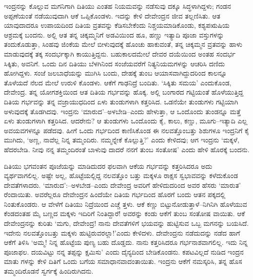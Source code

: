 ಇಂದ್ರನನ್ನು ಕೊಲ್ಲುವ ಮಗನಿಗಾಗಿ ದಿತಿಯು ಎಂತಹ ನಿಯಮವನ್ನು ನಡೆಸುವು ದಕ್ಕೂ ಸಿದ್ಧಳಾಗಿದ್ದಳು; ಗಂಡನ ಅಪ್ಪಣೆಯಂತೆ ನಡೆಯುವುದಾಗಿ ಆಕೆ ಒಪ್ಪಿಕೊಂಡಳು. ಇದನ್ನು ಕೇಳಿ ದೇವೇಂದ್ರನ ಜೀವ ತಲ್ಲಣಿಸಿತು. ಆತ ಯಾವುದಾದರೂ ಉಪಾಯದಿಂದ ದಿತಿಯ ವ್ರತವನ್ನು ಕೆಡಿಸಬೇಕೆಂದು ನಿಶ್ಚಯಮಾಡಿಕೊಂಡು, ಕಶ್ಯಪಋಷಿಯ ಆಶ್ರಮಕ್ಕೆ ಬಂದನು. ಅಲ್ಲಿ ಆತ ತನ್ನ ಚಿಕ್ಕಮ್ಮನಿಗೆ ಅಡವಿಯಿಂದ ಹೂ, ಹಣ್ಣು ಇತ್ಯಾದಿ ಪೂಜಾ ವಸ್ತುಗಳನ್ನು ತಂದುಕೊಡುತ್ತಾ, ಸಿಂಹವು ಜಿಂಕೆಯ ಮೇಲೆ ಬೀಳುವುದಕ್ಕೆ ಹೊಂಚು ಹಾಕುವಂತೆ, ತನ್ನ ಚಿಕ್ಕಮ್ಮನ ವ್ರತವನ್ನು ಹಾಳು ಮಾಡುವುದಕ್ಕೆ ತಕ್ಕ ಸಂದರ್ಭಕ್ಕಾಗಿ ಕಾಯುತ್ತಿದ್ದನು. ಬಹುಕಾಲದಮೇಲೆ ದೇವರ ದಯೆಯಿಂದ ಅಂತಹ ಸಂದರ್ಭ ಸಿಕ್ಕಿತು, ಅವನಿಗೆ. ಒಂದು ದಿನ ದಿತಿಯು ಬೆಳಗಿನಿಂದ ಸಂಜೆಯವರೆಗೆ ನಿತ್ಯನಿಯಮಗಳನ್ನು ಆಚರಿಸಿ ದಣಿದು ಹೋಗಿದ್ದಳು. ಸಂಜೆ ಜಲಬಾಧೆಯನ್ನು ಮುಗಿಸಿ ಬಂದು, ದೇಹಕ್ಕೆ ತುಂಬ ಆಯಾಸವಾಗಿದ್ದುದರಿಂದ ಕಾಲನ್ನೂ ತೊಳೆಯದೆ ನೆಲದ ಮೇಲೆ ಉರುಳಿ ಕೊಂಡಳು. ಆಕೆಗೆ ಗಾಢನಿದ್ರೆ ಬಂದಿತು. ‘ಸಿಕ್ಕಿತು ಸಮಯ’ ಎಂದುಕೊಂಡ, ದೇವೇಂದ್ರ. ತನ್ನ ಯೋಗಶಕ್ತಿಯಿಂದ ಆತ ದಿತಿಯ ಗರ್ಭವನ್ನು ಹೊಕ್ಕ. ಅಲ್ಲಿ ಬಂಗಾರದ ಗಟ್ಟಿಯಂತೆ ಹೊಳೆಯುತ್ತಿದ್ದ ದಿತಿಯ ಗರ್ಭವನ್ನು ತನ್ನ ವಜ್ರಾಯುಧದಿಂದ ಏಳು ತುಂಡುಗಳಾಗಿ ಕತ್ತರಿಸಿದ. ಒಡನೆಯೇ ತುಂಡುಗಳು ಗಟ್ಟಿಯಾಗಿ ಅಳುವುದಕ್ಕೆ ತೊಡಗಿದವು. ಇಂದ್ರನು ‘ಮಾರುದ’–ಅಳಬೇಡಿ–ಎಂದು ಹೇಳುತ್ತಾ, ಆ ಒಂದೊಂದು ತುಂಡನ್ನೂ ಮತ್ತೆ ಏಳು ತುಂಡುಗಳಾಗಿ ಕತ್ತರಿಸಿದ. ಆದರೇನು? ಆ ತುಂಡುಗಳು ಒಂದೊಂದು ಕೈ, ಕಾಲು, ಕಣ್ಣು, ಮೂಗು–ಇತ್ಯಾದಿ ಎಲ್ಲ ಅವಯವಗಳನ್ನೂ ಪಡೆದವು. ಹೀಗೆ ಒಂದು ಗರ್ಭದಿಂದ ಕಾಣಿಸಿಕೊಂಡ ಈ ನಲವತ್ತೊಂಬತ್ತು ಶಿಶುಗಳೂ ಇಂದ್ರನಿಗೆ ಕೈ ಮುಗಿದು, ‘ಅಣ್ಣ, ನಾವೆಲ್ಲ ನಿನ್ನ ತಮ್ಮಂದಿರು. ನಮ್ಮನ್ನೇಕೆ ಕೊಲ್ಲುತ್ತಿ?’ ಎಂದು ಕೇಳಿದವು; ಆಗ ಇಂದ್ರನು ‘ಮಕ್ಕಳೆ, ಹೆದರಬೇಡಿ. ನೀವು ನನ್ನ ತಮ್ಮಂದಿರಂತೆ ಬಾಳುವು ದಾದರೆ ನನಗೆ ತುಂಬ ಸಂತೋಷ’ ಎಂದು ಹೇಳಿ ಹೊರಕ್ಕೆ ಬಂದನು. 

ದಿತಿಯು ಭಗವಂತನ ಪೂಜೆಯನ್ನು ಮಾಡಿದುದರ ಫಲವಾಗಿ ಆಕೆಯ ಗರ್ಭವನ್ನು ಕತ್ತರಿಸಿದರೂ ಅದು ವ್ಯರ್ಥವಾಗಲಿಲ್ಲ. ಅಷ್ಟೇ ಅಲ್ಲ, ಹೊಟ್ಟೆಯಲ್ಲಿದ್ದ ನಲವತ್ತೊಂ ಬತ್ತು ಮಕ್ಕಳೂ ರಾಕ್ಷಸ ಸ್ವಭಾವವನ್ನು ಕಳೆದುಕೊಂಡ ದೇವತೆಗಳಾದರು. ‘ಮಾರುದ’:–ಅಳಬೇಡ–ಎಂದು ದೇವೇಂದ್ರ ಅವರಿಗೆ ಹೇಳಿದುದರಿಂದ ಅವರ ಹೆಸರು ‘ಮಾರುತ’ ರೆಂದಾಯಿತು. ಅವರೆಲ್ಲರೂ ದೇವೇಂದ್ರನ ಹಿಂದೆಯೇ ದಿತಿಯ ಗರ್ಭದಿಂದ ಹೊರಗೆ ಬಂದು ಆತನ ಪಕ್ಕದಲ್ಲಿ ನಿಂತುಕೊಂಡರು. ಆ ವೇಳೆಗೆ ದಿತಿಯು ನಿದ್ರೆಯಿಂದ ಎಚ್ಚೆ ತ್ತಳು. ಆಕೆ ಕಣ್ಣು ಬಿಟ್ಟುನೋಡುತ್ತಾಳೆ–ನಿಗಿನಿಗಿ ಹೊಳೆಯುವ ಕೆಂಡದಂತಹ ಮೈ ಬಣ್ಣದ ಮಕ್ಕಳು ಇದಿರಿಗೆ ನಿಂತಿದ್ದಾರೆ! ಅವರನ್ನು ಕಂಡು ಆಕೆಗೆ ತುಂಬ ಸಂತೋಷ ವಾಯಿತು. ಆಕೆ ದೇವೇಂದ್ರನನ್ನು ಕುರಿತು ‘ಮಗು, ದೇವೇಂದ್ರ! ನಾನು ದೇವತೆಗಳಿಗೆ ಭಯವನ್ನು ಹುಟ್ಟಿಸುವ ಒಬ್ಬ ಮಗನನ್ನು ಬಯಸಿದೆ. ಇದೇನು ನಲವತ್ತೊಂಬತ್ತು ಮಕ್ಕಳು ಹುಟ್ಟಿರುವರಲ್ಲಾ!’ಎಂದು ಕೇಳಿದಳು. ದೇವೇಂದ್ರನು ನಡೆದುದನ್ನು ನಡೆದ ಹಾಗೆ ಆಕೆಗೆ ತಿಳಿಸಿ ‘ಅಮ್ಮ! ನಿನ್ನ ಹೊಟ್ಟೆಯ ಪುಣ್ಯ ಬಹು ದೊಡ್ಡದು. ನಾನು ಕತ್ತರಿಸಿದರೂ ಗರ್ಭನಾಶವಾಗಲಿಲ್ಲ. ಇದು ನಿನ್ನ ಪೂಜಾಫಲ. ದಯವಿಟ್ಟು ನನ್ನ ತಪ್ಪನ್ನು ಕ್ಷಮಿಸು’ ಎಂದು ದೈನ್ಯದಿಂದ ಬೇಡಿಕೊಂಡನು. ಕಪಟವಿಲ್ಲದೆ ನುಡಿದ ಇಂದ್ರನ ಮಾತು ಗಳನ್ನು ಕೇಳಿ ದಿತಿಗೆ ಒಂದು ಬಗೆಯ ಸಮಾಧಾನವಾದಂತಾಯಿತು. ಇಂದ್ರನು ಆಕೆಗೆ ನಮಸ್ಕರಿಸಿ, ತನ್ನ ಹೊಸ ತಮ್ಮಂದಿರೊಡನೆ ಸ್ವರ್ಗಕ್ಕೆ ಹಿಂದಿರುಗಿದನು.

